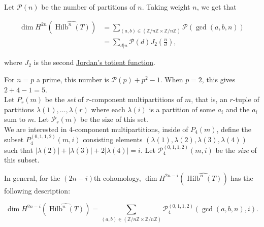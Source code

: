 \documentclass{article}
\theoremstyle{definition}
\DeclareMathOperator{\Hilb}{{\text{Hilb}}}
\begin{document}
Let $\mathcal{P}(n)$ be the number of partitions of $n$. Taking weight $n$, we get that 

\begin{align*}
    \dim H^{2n}(\widehat{\Hilb^n(T)})&=\sum_{(a,b)\in (\mathbb{Z}/n\mathbb{Z}\times \mathbb{Z}/n\mathbb{Z})} \mathcal{P}(\gcd(a,b,n))\\
    &=\sum_{d|n} \mathcal{P}(d)J_2(\frac{n}{d}),
\end{align*}

where $J_2$ is the second \href{https://en.wikipedia.org/wiki/Jordan\%27s_totient_function}{Jordan's totient function}.

For $n=p$ a prime, this number is $\mathcal{P}(p)+p^2-1$. When $p=2$, this gives $2+4-1=5$.\\

Let $P_r(m)$ be the \emph{set} of $r$-component multipartitions of $m$, that is, an $r$-tuple of partitions $\lambda(1),\dots,\lambda(r)$ where each $\lambda(i)$ is a partition of some $a_i$ and the $a_i$ sum to $m$. Let $\mathcal{P}_r(m)$ be the size of this set.\\

We are interested in 4-component multipartitions, inside of ${P}_4(m)$, define the subset ${P}_4^{(0,1,1,2)}(m,i)$ consisting elements $(\lambda(1),\lambda(2),\lambda(3),\lambda(4))$ such that $|\lambda(2)|+|\lambda(3)|+2|\lambda(4)|=i$. Let $\mathcal{P}_4^{(0,1,1,2)}(m,i)$ be the \emph{size} of this subset.

In general, for the $(2n-i)$th cohomology, $\dim H^{2n-i}(\widehat{\Hilb^n(T)})$ has the following description:

$$\dim H^{2n-i}(\widehat{\Hilb^n(T)})=\sum_{(a,b)\in (\mathbb{Z}/n\mathbb{Z}\times \mathbb{Z}/n\mathbb{Z})} \mathcal{P}_4^{(0,1,1,2)}(\gcd(a,b,n),i).$$





{\footnotesize
}
\end{document}
